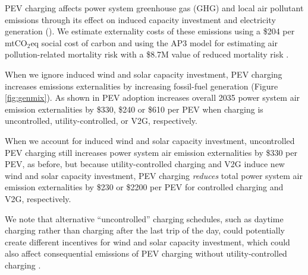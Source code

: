 \documentclass[9pt,twocolumn,twoside,lineno]{pnas-new}
\begin{document}
PEV charging affects power system greenhouse gas (GHG) and local air pollutant emissions through its effect on induced capacity investment and electricity generation (). We estimate externality costs of these emissions using a \$204 per mtCO$_2$eq social cost of carbon \cite{noauthor_epa_2023} and using the AP3 model for estimating air pollution-related mortality risk with a \$8.7M value of reduced mortality risk \cite{clay_external_2019}.

When we ignore induced wind and solar capacity investment, PEV charging increases emissions externalities by increasing fossil-fuel generation (Figure \ref{fig:genmix}). As shown in  PEV adoption increases overall 2035 power system air emission externalities by \$330, \$240 or \$610 per PEV when charging is uncontrolled, utility-controlled, or V2G, respectively.

When we account for induced wind and solar capacity investment, uncontrolled PEV charging still increases power system air emission externalities by \$330 per PEV, as before, but because utility-controlled charging and V2G induce new wind and solar capacity investment, PEV charging \textit{reduces} total power system air emission externalities by \$230 or \$2200 per PEV for controlled charging and V2G, respectively. 

We note that alternative ``uncontrolled'' charging schedules, such as daytime charging rather than charging after the last trip of the day, could potentially create different incentives for wind and solar capacity investment, which could also affect consequential emissions of PEV charging without utility-controlled charging \cite{holland_regularization_2024}.

\end{document}
